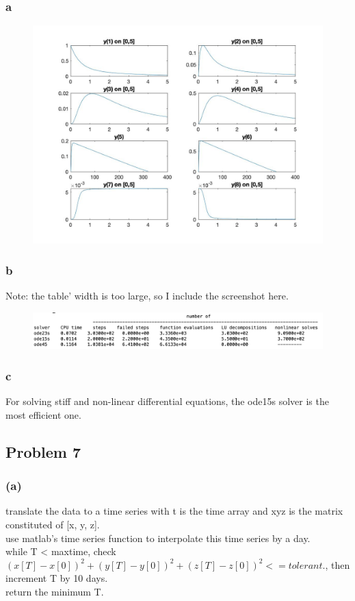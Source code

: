 \documentclass[11pt,fleqn]{exam}
\begin{document}
\subsubsection*{a}
\begin{figure}[H]
  	\centering
  	\includegraphics[width=1\textwidth]{q6a.jpg}
\end{figure}	

\subsubsection*{b}
Note: the table' width is too large, so I include the screenshot here.
\begin{figure}[H]
  	\centering
  	\includegraphics[width=1\textwidth]{q6b.png}
\end{figure}	

\subsubsection*{c}
For solving stiff and non-linear differential equations, the ode15s solver is the most efficient one.

\subsection*{Problem 7}
\subsubsection*{(a)}
translate the data to a time series with t is the time array and xyz is the matrix constituted of [x, y, z].\\
use matlab's time series function to interpolate this time series by a day.\\
while T < maxtime, check $(x[T] - x[0])^2 + (y[T] - y[0])^2 + (z[T] - z[0])^2 <= tolerant.$, then increment T by 10 days.\\
return the minimum T.\\
\end{document}

